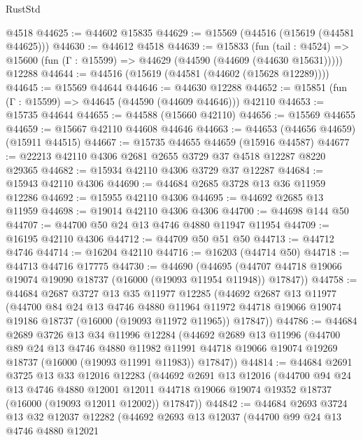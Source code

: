 \begin{lexlean}{RustStd}
\begin{coremodule}
    @4518
@44625 := @44602 @15835
@44629 := @15569 (@44516 (@15619 (@44581 @44625)))
@44630 := @44612 @4518
@44639 := @15833
    (fun (tail : @4524) => @15600 (fun (Γ : @15599) => @44629 (@44590 (@44609 (@44630 @15631)))))
    @12288
@44644 := @44516 (@15619 (@44581 (@44602 (@15628 @12289))))
@44645 := @15569 @44644
@44646 := @44630 @12288
@44652 := @15851 (fun (Γ : @15599) => @44645 (@44590 (@44609 @44646))) @42110
@44653 := @15735 @44644
@44655 := @44588 (@15660 @42110)
@44656 := @15569 @44655
@44659 := @15667 @42110 @44608 @44646
@44663 := @44653 (@44656 @44659) (@15911 @44515)
@44667 := @15735 @44655 @44659 (@15916 @44587)
@44677 := @22213 @42110 @4306 @2681 @2655 @3729 @37 @4518 @12287 @8220 @29365
@44682 := @15934 @42110 @4306 @3729 @37 @12287
@44684 := @15943 @42110 @4306
@44690 := @44684 @2685 @3728 @13 @36 @11959 @12286
@44692 := @15955 @42110 @4306
@44695 := @44692 @2685 @13 @11959
@44698 := @19014 @42110 @4306 @4306
@44700 := @44698 @144 @50
@44707 := @44700 @50 @24 @13 @4746 @4880 @11947 @11954
@44709 := @16195 @42110 @4306
@44712 := @44709 @50 @51 @50
@44713 := @44712 @4746
@44714 := @16204 @42110
@44716 := @16203 (@44714 @50)
@44718 := @44713 @44716 @17775
@44730 := @44690
    (@44695 (@44707 @44718 @19066 @19074 @19090 @18737 (@16000 (@19093 @11954 @11948)) @17847))
@44758 := @44684
    @2687
    @3727
    @13
    @35
    @11977
    @12285
    (@44692
      @2687
      @13
      @11977
      (@44700
        @84
        @24
        @13
        @4746
        @4880
        @11964
        @11972
        @44718
        @19066
        @19074
        @19186
        @18737
        (@16000 (@19093 @11972 @11965))
        @17847))
@44786 := @44684
    @2689
    @3726
    @13
    @34
    @11996
    @12284
    (@44692
      @2689
      @13
      @11996
      (@44700
        @89
        @24
        @13
        @4746
        @4880
        @11982
        @11991
        @44718
        @19066
        @19074
        @19269
        @18737
        (@16000 (@19093 @11991 @11983))
        @17847))
@44814 := @44684
    @2691
    @3725
    @13
    @33
    @12016
    @12283
    (@44692
      @2691
      @13
      @12016
      (@44700
        @94
        @24
        @13
        @4746
        @4880
        @12001
        @12011
        @44718
        @19066
        @19074
        @19352
        @18737
        (@16000 (@19093 @12011 @12002))
        @17847))
@44842 := @44684
    @2693
    @3724
    @13
    @32
    @12037
    @12282
    (@44692
      @2693
      @13
      @12037
      (@44700
        @99
        @24
        @13
        @4746
        @4880
        @12021

\end{coremodule}
\end{lexlean}
